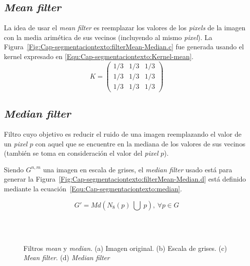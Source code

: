 \subsection{\textit{Mean filter}}
La idea de usar el \textit{mean filter} es reemplazar los valores de los 
\textit{pixels} de la imagen con la media arimética de sus vecinos (incluyendo
al mismo \textit{pixel}). La
Figura~\ref{Fig:Cap-segmentaciontexto:filterMean-Median.c} fue generada usando
el kernel expresado en \ref{Equ:Cap-segmentaciontexto:Kernel-mean}.
\begin{equation}
K =  \left( \begin{array}{ccc}
1/3 & 1/3 & 1/3 \\
1/3 & 1/3 & 1/3 \\
1/3 & 1/3 & 1/3 \end{array} \right)
\label{Equ:Cap-segmentaciontexto:Kernel-mean}
\end{equation}

\subsection{\textit{Median filter}}
Filtro cuyo objetivo es reducir el ruido de una imagen reemplazando el valor 
de un \textit{pixel} $p$ con aquel que se encuentre en la mediana de los valores
de sus vecinos (también se toma en consideración el valor del \textit{pixel}
$p$). 

Siendo $G^{n,m}$ una imagen en escala de grises, el \textit{median filter}
usado está para generar la
Figura~\ref{Fig:Cap-segmentaciontexto:filterMean-Median.d} está definido
mediante la ecuación~\ref{Equ:Cap-segmentaciontexto:median}.

\begin{equation}
	G' = Md \left( N_8(p)~ \bigcup ~p \right), ~\forall p \in G
	\label{Equ:Cap-segmentaciontexto:median}
\end{equation}

\begin{figure}[h!]
	\centering
   { }
   \\
   { }
   \\
  \caption[Filtros \textit{mean} y \textit{median}]{Filtros \textit{mean} y 
  \textit{median}. (a) Imagen original. (b) Escala de grises. (c) \textit{Mean
filter}. (d) \textit{Median filter}}
	\label{Fig:Cap-segmentaciontexto:filterMean-Median}
\end{figure}

